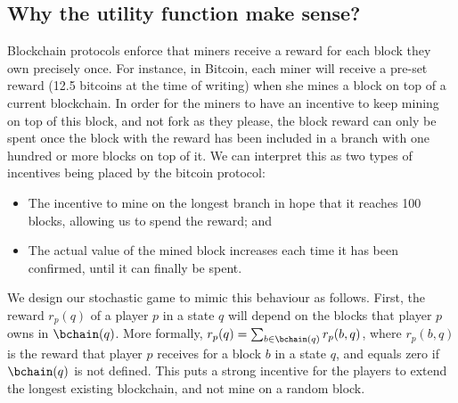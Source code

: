 
\subsection{Why the utility function make sense?}\label{sec-wtf}


Blockchain protocols enforce that miners receive a reward for each block they own precisely once. For instance, in Bitcoin, each miner will receive a pre-set reward (12.5 bitcoins at the time of writing) when she mines a block on top of a current blockchain. In order for the miners to have an incentive to keep mining on top of this block, and not fork as they please, the block reward can only be spent once the block with the reward has been included in a branch with one hundred or more blocks on top of it. We can interpret this as two types of incentives being placed by the bitcoin protocol:
\begin{itemize}
\item The incentive to mine on the longest branch in hope that it reaches 100 blocks, allowing us to spend the reward; and
\item The actual value of the mined block increases each time it has been confirmed, until it can finally be spent.
\end{itemize}

We design our stochastic game to mimic this behaviour as follows.  First, the reward $r_p(q)$ of a player $p$ in a state $q$ will depend on the blocks that player $p$ owns in $\bchain(q)$. More formally, $r_p(q)= \sum_{b \in \bchain(q)} r_p(b,q)$, where $r_p(b,q)$ is the reward that player $p$ receives for a block $b$ in a state $q$, and equals zero if $\bchain(q)$ is not defined. This puts a strong incentive for the players to extend the longest existing blockchain, and not mine on a random block. 

